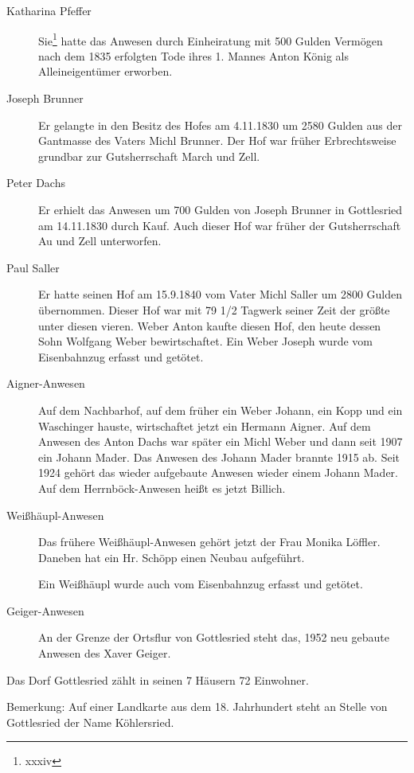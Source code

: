 \documentclass{book}
\begin{document}
\begin{description}
\item[Katharina Pfeffer] Sie\footnote{xxxiv} hatte das Anwesen durch
Einheiratung mit 500 Gulden Vermögen nach dem 1835 erfolgten Tode ihres
1. Mannes Anton König als Alleineigentümer erworben.

\item[Joseph Brunner] Er gelangte in den Besitz des Hofes am 4.11.1830
um 2580 Gulden aus der Gantmasse des Vaters Michl Brunner. Der Hof war
früher Erbrechtsweise grundbar zur Gutsherrschaft March und Zell.

\item[Peter Dachs] Er erhielt das Anwesen um 700 Gulden von Joseph
Brunner in Gottlesried am 14.11.1830 durch Kauf. Auch dieser Hof war
früher der Gutsherrschaft Au und Zell unterworfen.

\item[Paul Saller] Er hatte seinen Hof am 15.9.1840 vom Vater Michl
Saller um 2800 Gulden übernommen. Dieser Hof war mit 79 1/2 Tagwerk
seiner Zeit der größte unter diesen vieren. Weber Anton kaufte diesen
Hof, den heute dessen Sohn Wolfgang Weber bewirtschaftet. Ein Weber
Joseph wurde vom Eisenbahnzug erfasst und getötet.

\item[Aigner-Anwesen] Auf dem Nachbarhof, auf dem früher ein Weber
Johann, ein Kopp und ein Waschinger hauste, wirtschaftet jetzt ein
Hermann Aigner. Auf dem Anwesen des Anton Dachs war später ein Michl
Weber und dann seit 1907 ein Johann Mader. Das Anwesen des Johann Mader
brannte 1915 ab. Seit 1924 gehört das wieder aufgebaute Anwesen wieder
einem Johann Mader. Auf dem Herrnböck-Anwesen heißt es jetzt Billich.

\item[Weißhäupl-Anwesen] Das frühere Weißhäupl-Anwesen gehört jetzt der
Frau Monika Löffler. Daneben hat ein Hr. Schöpp einen Neubau aufgeführt.

Ein Weißhäupl wurde auch vom Eisenbahnzug erfasst und getötet.

\item[Geiger-Anwesen] An der Grenze der Ortsflur von Gottlesried steht
das, 1952 neu gebaute Anwesen des Xaver Geiger.
\end{description}

Das Dorf Gottlesried zählt in seinen 7 Häusern 72 Einwohner.

Bemerkung: Auf einer Landkarte aus dem 18. Jahrhundert steht an Stelle
von Gottlesried der Name Köhlersried.
\end{document}
